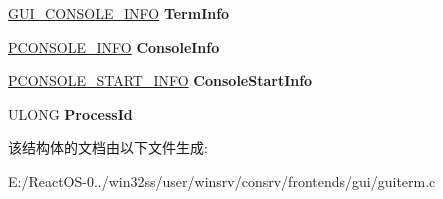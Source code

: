 \begin{DoxyCompactItemize}
\mbox{\label{struct___g_u_i___i_n_i_t___i_n_f_o_a428e192a707b387e1427f18cbb6425a2}} 
\hyperlink{struct___g_u_i___c_o_n_s_o_l_e___i_n_f_o}{G\+U\+I\+\_\+\+C\+O\+N\+S\+O\+L\+E\+\_\+\+I\+N\+FO} {\bfseries Term\+Info}
\item 
\mbox{\label{struct___g_u_i___i_n_i_t___i_n_f_o_ae53dcf78bef84222a096031914c26a6d}} 
\hyperlink{struct___c_o_n_s_o_l_e___i_n_f_o}{P\+C\+O\+N\+S\+O\+L\+E\+\_\+\+I\+N\+FO} {\bfseries Console\+Info}
\item 
\mbox{\label{struct___g_u_i___i_n_i_t___i_n_f_o_a5d23f3fd9f65c0b85778b84662b1af2e}} 
\hyperlink{struct___c_o_n_s_o_l_e___s_t_a_r_t___i_n_f_o}{P\+C\+O\+N\+S\+O\+L\+E\+\_\+\+S\+T\+A\+R\+T\+\_\+\+I\+N\+FO} {\bfseries Console\+Start\+Info}
\item 
\mbox{\label{struct___g_u_i___i_n_i_t___i_n_f_o_a16f4e01fbb5dbb29424cb966a5e47fd4}} 
U\+L\+O\+NG {\bfseries Process\+Id}
\end{DoxyCompactItemize}


该结构体的文档由以下文件生成\+:\begin{DoxyCompactItemize}
\item 
E\+:/\+React\+O\+S-\/0../win32ss/user/winsrv/consrv/frontends/gui/guiterm.\+c\end{DoxyCompactItemize}
